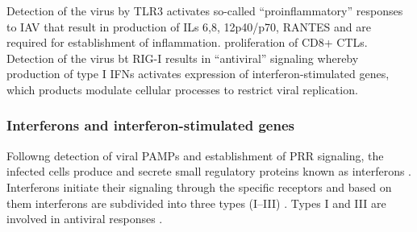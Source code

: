 		
	
		Detection of the virus by TLR3 activates so-called ``proinflammatory'' responses\parencite{LeGoffic2007} to IAV that result in production of ILs 6,8, 12p40/p70, RANTES and are required for establishment of inflammation. proliferation of CD8+ CTLs. Detection of the virus bt RIG-I results in ``antiviral'' signaling \parencite{LeGoffic2007} whereby production of type I IFNs activates expression of interferon-stimulated genes, which products modulate cellular processes to restrict viral replication.
		
		\subsubsection{Interferons and interferon-stimulated genes}
		
		Followng detection of viral \gls{PAMP}s and establishment of \gls{PRR} signaling, the infected cells produce and secrete small regulatory proteins known as interferons \parencite{Fensterl2009}. Interferons initiate their signaling through the specific receptors and based on them interferons are subdivided into three types (I--III) \parencite{Branca1981, Sheppard2003}. Types I and III are involved in antiviral responses \parencite{Kotenko2003, Garcia-Sastre2006}.
		
